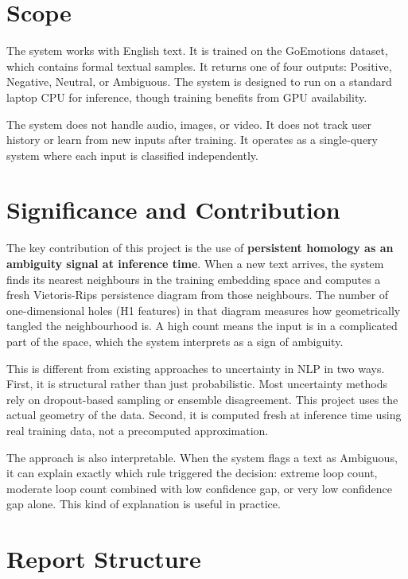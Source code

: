\section{Scope}

The system works with English text. It is trained on the GoEmotions dataset, which contains
formal textual samples. It returns one of four outputs: Positive, Negative, Neutral, or Ambiguous. The system
is designed to run on a standard laptop CPU for inference, though training benefits from GPU
availability.

The system does not handle audio, images, or video. It does not track user history or learn from
new inputs after training. It operates as a single-query system where each input is classified
independently.

\section{Significance and Contribution}

The key contribution of this project is the use of \textbf{persistent homology as an ambiguity
signal at inference time}. When a new text arrives, the system finds its nearest neighbours in
the training embedding space and computes a fresh Vietoris-Rips persistence diagram from
those neighbours. The number of one-dimensional holes (H1 features) in that diagram measures
how geometrically tangled the neighbourhood is. A high count means the input is in a
complicated part of the space, which the system interprets as a sign of ambiguity.

This is different from existing approaches to uncertainty in NLP in two ways. First, it is
structural rather than just probabilistic. Most uncertainty methods rely on dropout-based
sampling or ensemble disagreement. This project uses the actual geometry of the data. Second,
it is computed fresh at inference time using real training data, not a precomputed approximation.

The approach is also interpretable. When the system flags a text as Ambiguous, it can explain
exactly which rule triggered the decision: extreme loop count, moderate loop count combined
with low confidence gap, or very low confidence gap alone. This kind of explanation is useful in
practice.

\section{Report Structure}

